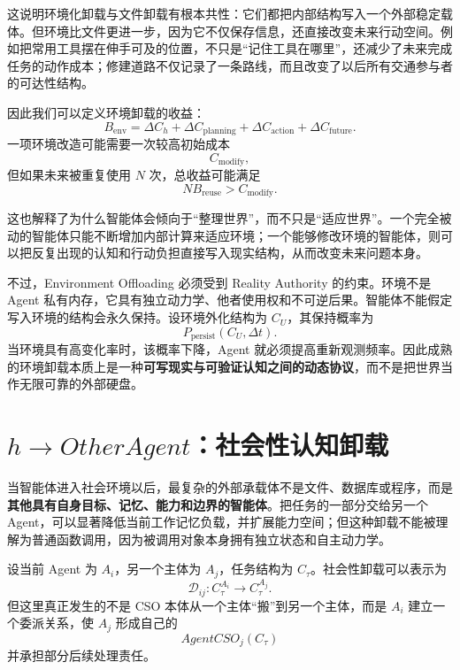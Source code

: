 这说明环境化卸载与文件卸载有根本共性：它们都把内部结构写入一个外部稳定载体。但环境比文件更进一步，因为它不仅保存信息，还直接改变未来行动空间。例如把常用工具摆在伸手可及的位置，不只是“记住工具在哪里”，还减少了未来完成任务的动作成本；修建道路不仅记录了一条路线，而且改变了以后所有交通参与者的可达性结构。

因此我们可以定义环境卸载的收益：
\begin{equation}
B_{\mathrm{env}}
=
\Delta C_h
+
\Delta C_{\mathrm{planning}}
+
\Delta C_{\mathrm{action}}
+
\Delta C_{\mathrm{future}}.
\end{equation}
一项环境改造可能需要一次较高初始成本
\begin{equation}
C_{\mathrm{modify}},
\end{equation}
但如果未来被重复使用 $N$ 次，总收益可能满足
\begin{equation}
N B_{\mathrm{reuse}}
>
C_{\mathrm{modify}}.
\end{equation}

这也解释了为什么智能体会倾向于“整理世界”，而不只是“适应世界”。一个完全被动的智能体只能不断增加内部计算来适应环境；一个能够修改环境的智能体，则可以把反复出现的认知和行动负担直接写入现实结构，从而改变未来问题本身。

不过，Environment Offloading 必须受到 Reality Authority 的约束。环境不是 Agent 私有内存，它具有独立动力学、他者使用权和不可逆后果。智能体不能假定写入环境的结构会永久保持。设环境外化结构为 $C_U$，其保持概率为
\begin{equation}
P_{\mathrm{persist}}(C_U,\Delta t).
\end{equation}
当环境具有高变化率时，该概率下降，Agent 就必须提高重新观测频率。因此成熟的环境卸载本质上是一种\textbf{可写现实与可验证认知之间的动态协议}，而不是把世界当作无限可靠的外部硬盘。

\section{$h\rightarrow OtherAgent$：社会性认知卸载}

当智能体进入社会环境以后，最复杂的外部承载体不是文件、数据库或程序，而是\textbf{其他具有自身目标、记忆、能力和边界的智能体}。把任务的一部分交给另一个 Agent，可以显著降低当前工作记忆负载，并扩展能力空间；但这种卸载不能被理解为普通函数调用，因为被调用对象本身拥有独立状态和自主动力学。

设当前 Agent 为 $A_i$，另一个主体为 $A_j$，任务结构为 $C_\tau$。社会性卸载可以表示为
\begin{equation}
\mathcal D_{ij}:
C_\tau^{A_i}
\rightarrow
C_\tau^{A_j}.
\end{equation}
但这里真正发生的不是 CSO 本体从一个主体“搬”到另一个主体，而是 $A_i$ 建立一个委派关系，使 $A_j$ 形成自己的
\begin{equation}
AgentCSO_j(C_\tau)
\end{equation}
并承担部分后续处理责任。

